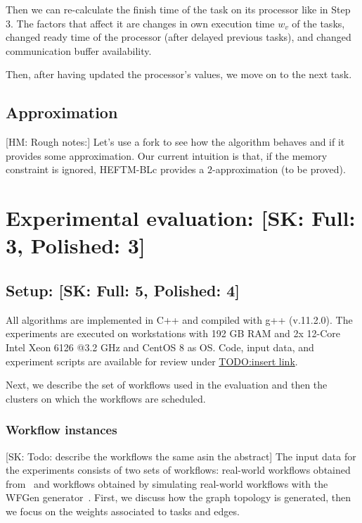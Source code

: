 \documentclass[conference]{IEEEtran}
\newcommand{\skug}[1]{{\color{blue}[SK: #1]}}
\newcommand{\hmey}[1]{{\color{red}[HM: #1]}}
\begin{document}
    Then we can re-calculate the finish time of the task on its processor like in Step 3.
    The factors that affect it are changes in own execution time $w_v$ of the tasks, changed ready time of the processor
    (after delayed previous tasks), and changed communication buffer availability.

    Then, after having updated the processor's values, we move on to the next task.


    \subsection{Approximation}
    \hmey{Rough notes:}
    Let's use a fork to see how the algorithm behaves and if it provides some approximation. Our current intuition is that, if the memory constraint is ignored, HEFTM-BLc provides a $2$-approximation (to be proved).

    \section{Experimental evaluation: \skug{Full: 3, Polished: 3}}
    \subsection{Setup: \skug{Full: 5, Polished: 4}}
    \label{sec:setup}

    All algorithms are implemented in C++ and compiled with g++ (v.11.2.0).
    The experiments are executed on workstations with 192 GB RAM and 2x 12-Core Intel Xeon 6126 @3.2 GHz
    and CentOS 8 as OS.
    Code, input data, and experiment scripts are available for review under \url{TODO:insert link}.

    Next, we describe the set of workflows used in the evaluation and then the clusters on which the
    workflows are scheduled.

    \subsubsection{Workflow instances}
    \skug{Todo: describe the workflows the same asin the abstract}
    The input data for the experiments consists of two sets of workflows: real-world workflows
    obtained from~\cite{ewels2020nf} and workflows obtained by simulating real-world workflows
    with the WFGen generator~\cite{COLEMAN202216}.
    First, we discuss how the graph topology is generated,
    then we focus on the weights associated to tasks and edges.
\end{document}
